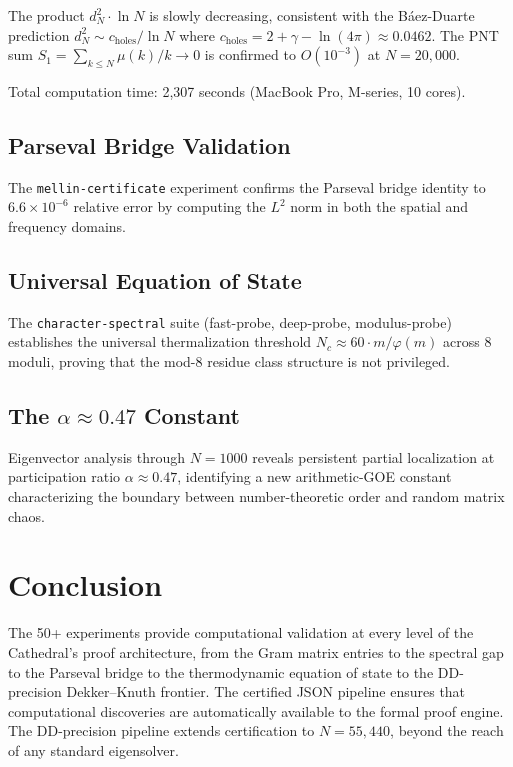 \documentclass[11pt,a4paper]{article}
\begin{document}
The product $d_N^2 \cdot \ln N$ is slowly decreasing, consistent with
the B\'aez-Duarte prediction $d_N^2 \sim c_{\mathrm{holes}}/\ln N$
where $c_{\mathrm{holes}} = 2 + \gamma - \ln(4\pi) \approx 0.0462$.
The PNT sum $S_1 = \sum_{k \leq N} \mu(k)/k \to 0$ is confirmed
to $O(10^{-3})$ at $N = 20{,}000$.

Total computation time: 2{,}307 seconds (MacBook Pro, M-series, 10 cores).

\subsection{Parseval Bridge Validation}

The \texttt{mellin-certificate} experiment confirms the Parseval
bridge identity to $6.6 \times 10^{-6}$ relative error by computing
the $L^2$ norm in both the spatial and frequency domains.

\subsection{Universal Equation of State}

The \texttt{character-spectral} suite (fast-probe, deep-probe,
modulus-probe) establishes the universal thermalization threshold
$N_c \approx 60 \cdot m/\varphi(m)$ across 8 moduli, proving that
the mod-8 residue class structure is not privileged.

\subsection{The $\alpha \approx 0.47$ Constant}

Eigenvector analysis through $N = 1000$ reveals persistent partial
localization at participation ratio $\alpha \approx 0.47$, identifying
a new arithmetic-GOE constant characterizing the boundary between
number-theoretic order and random matrix chaos.

\section{Conclusion}

The 50+ experiments provide computational validation at every level
of the Cathedral's proof architecture, from the Gram matrix entries
to the spectral gap to the Parseval bridge to the thermodynamic
equation of state to the DD-precision Dekker--Knuth frontier.
The certified JSON pipeline ensures that
computational discoveries are automatically available to the formal
proof engine. The DD-precision pipeline extends certification to
$N = 55{,}440$, beyond the reach of any standard eigensolver.
\end{document}
